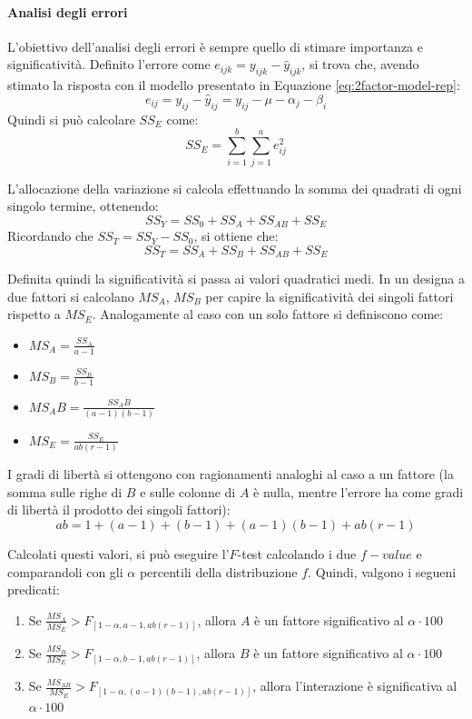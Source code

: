 \documentclass{article}
\begin{document}
\paragraph{Analisi degli errori}
L'obiettivo dell'analisi degli errori è sempre quello di stimare importanza e significatività. 
Definito l'errore come $e_{ijk} = y_{ijk} -  \hat{y}_{ijk}$, si trova che, avendo stimato la 
risposta con il modello presentato in Equazione \ref{eq:2factor-model-rep}:
\[
  e_{ij} = y_{ij} - \hat{y}_{ij} = y_{ij} - \mu - \alpha_j - \beta_i
\]
Quindi si può calcolare $SS_E$ come:
\[
  SS_E = \sum_{i=1}^b\sum_{j=1}^a e_{ij}^2
\]

L'allocazione della variazione si calcola effettuando la somma dei quadrati di ogni singolo
termine, ottenendo:
\[
  SS_Y = SS_0 + SS_A + SS_{AB} + SS_E
\]
Ricordando che $SS_T = SS_Y - SS_0$, si ottiene che: 
\[
  SS_T = SS_A+SS_B+ SS_{AB} + SS_E
\]

Definita quindi la significatività si passa ai valori quadratici medi. In un designa a due 
fattori si calcolano $MS_A$, $MS_B$ per capire la significatività dei singoli fattori
rispetto a $MS_E$. Analogamente al caso con un solo fattore si definiscono come:
\begin{itemize}
  \item $MS_A = \frac{SS_A}{a-1}$
  \item $MS_B = \frac{SS_B}{b-1}$
  \item $MS_AB = \frac{SS_AB}{(a-1)(b-1)}$
  \item $MS_E = \frac{SS_E}{ab(r-1)}$
\end{itemize}

I gradi di libertà si ottengono con ragionamenti analoghi al caso a un fattore (la somma 
sulle righe di $B$ e sulle colonne di $A$ è nulla, mentre l'errore ha come gradi di libertà
il prodotto dei singoli fattori):
\[
  ab = 1 + (a-1) + (b-1) + (a-1)(b-1) + ab(r-1)
\]

Calcolati questi valori, si può eseguire l'$F$-test calcolando i due $f-value$ e comparandoli
con gli $\alpha$ percentili della distribuzione $f$. Quindi, valgono i segueni predicati:
\begin{enumerate}[label=(\alph*)] 
  \item Se $\frac{MS_A}{MS_E} > F_{[1-\alpha, a-1, ab(r-1)]}$, allora $A$ è un fattore 
    significativo al $\alpha\cdot100$
  \item Se $\frac{MS_B}{MS_E} > F_{[1-\alpha, b-1, ab(r-1)]}$, allora $B$ è un fattore 
    significativo al $\alpha\cdot100$
  \item Se $\frac{MS_{AB}}{MS_E} > F_{[1-\alpha, (a-1)(b-1), ab(r-1)]}$, allora l'interazione
    è significativa al $\alpha\cdot100$
\end{enumerate}
\end{document}
